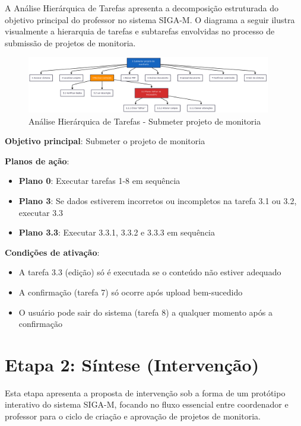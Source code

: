 \documentclass[12pt, a4paper]{report}
\begin{document}
A Análise Hierárquica de Tarefas apresenta a decomposição estruturada do objetivo principal do professor no sistema SIGA-M. O diagrama a seguir ilustra visualmente a hierarquia de tarefas e subtarefas envolvidas no processo de submissão de projetos de monitoria.

\begin{figure}[H]
\centering
\includegraphics[width=0.95\textwidth]{hta.png}
\caption{Análise Hierárquica de Tarefas - Submeter projeto de monitoria}
\label{fig:hta-diagram}
\end{figure}

\textbf{Objetivo principal}: Submeter o projeto de monitoria

\textbf{Planos de ação}:
\begin{itemize}
    \item \textbf{Plano 0}: Executar tarefas 1-8 em sequência
    \item \textbf{Plano 3}: Se dados estiverem incorretos ou incompletos na tarefa 3.1 ou 3.2, executar 3.3
    \item \textbf{Plano 3.3}: Executar 3.3.1, 3.3.2 e 3.3.3 em sequência
\end{itemize}

\textbf{Condições de ativação}:
\begin{itemize}
    \item A tarefa 3.3 (edição) só é executada se o conteúdo não estiver adequado
    \item A confirmação (tarefa 7) só ocorre após upload bem-sucedido
    \item O usuário pode sair do sistema (tarefa 8) a qualquer momento após a confirmação
\end{itemize}

\chapter{Etapa 2: Síntese (Intervenção)}
\label{ch:sintese}

Esta etapa apresenta a proposta de intervenção sob a forma de um protótipo interativo do sistema SIGA-M, focando no fluxo essencial entre coordenador e professor para o ciclo de criação e aprovação de projetos de monitoria.
\end{document}
